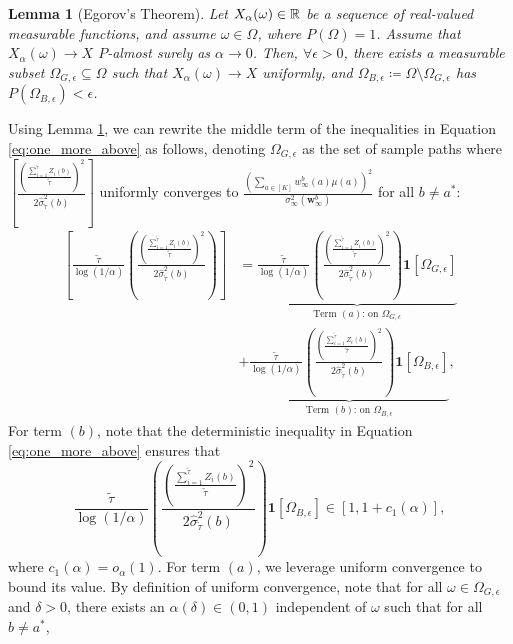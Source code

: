 \documentclass{article}
\newtheorem{lemma}{Lemma}
\begin{document}
\begin{appendices}
\begin{lemma}[Egorov's Theorem]\label{lem:egorov_thoerem}
    Let $X_\alpha(\omega) \in \mathbb{R}$ be a sequence of real-valued measurable functions, and assume $\omega \in \Omega$, where $P(\Omega)= 1$. Assume that $X_\alpha(\omega) \rightarrow X$ $P$-almost surely as $\alpha \rightarrow 0$. Then, $\forall \epsilon > 0$, there exists a measurable subset $\Omega_{G,\epsilon} \subseteq \Omega$ such that $X_{\alpha}(\omega) \rightarrow X$ uniformly, and $\Omega_{B,\epsilon} \coloneq \Omega \setminus \Omega_{G, \epsilon}$ has $P(\Omega_{B, \epsilon}) < \epsilon$. 
\end{lemma}

Using Lemma \ref{lem:egorov_thoerem}, we can rewrite the middle term of the inequalities in Equation \eqref{eq:one_more_above} as follows, denoting $\Omega_{G, \epsilon}$ as the set of sample paths where $\left[\frac{\left(\frac{\sum_{i=1}^{\tilde\tau}{Z}_i(b)}{\tilde\tau}\right)^2}{2 \hat\sigma_{\tilde\tau}^2(b)}\right]$ uniformly converges to $\frac{(\sum_{a \in [K]}w_\infty^b(a) \mu(a))^2}{\sigma_\infty^2(\bm{w}_\infty^b)}$ for all $b \neq a^*$:
\begin{align}
    \left[\frac{\tilde\tau}{\log(1/\alpha)}\left(\frac{\left(\frac{\sum_{i=1}^{\tilde\tau}{Z}_i(b)}{\tilde\tau}\right)^2}{2 \hat\sigma_{\tilde\tau}^2(b)}\right) \right] &= \underbrace{ 
    \frac{\tilde\tau}{\log(1/\alpha)}\left(\frac{\left(\frac{\sum_{i=1}^{\tilde\tau}{Z}_i(b)}{\tilde\tau}\right)^2}{2 \hat\sigma_{\tilde\tau}^2(b)}\right) \mathbf{1}\left[ \Omega_{G, \epsilon} \right]}_{\text{Term $(a)$: on }\Omega_{G, \epsilon}}\label{l:term_1}\\
    &+ \underbrace{\frac{\tilde\tau}{\log(1/\alpha)}\left(\frac{\left(\frac{\sum_{i=1}^{\tilde\tau}{Z}_i(b)}{\tilde\tau}\right)^2}{2 \hat\sigma_{\tilde\tau}^2(b)}\right)\mathbf{1}[\Omega_{B, \epsilon}] }_{\text{Term $(b)$: on }\Omega_{B , \epsilon}}, \label{l:term_2}
\end{align}
For term $(b)$, note that the deterministic inequality in Equation \eqref{eq:one_more_above} ensures that 
\begin{equation}
    \frac{\tilde\tau}{\log(1/\alpha)}\left(\frac{\left(\frac{\sum_{i=1}^{\tilde\tau}{Z}_i(b)}{\tilde\tau}\right)^2}{2 \hat\sigma_{\tilde\tau}^2(b)}\right)\mathbf{1}[\Omega_{B, \epsilon}] \in [1, 1+c_1(\alpha)],
\end{equation}
where $c_1(\alpha) = o_\alpha(1)$. For term $(a)$, we leverage uniform convergence to bound its value. By definition of uniform convergence, note that for all $\omega \in \Omega_{G, \epsilon}$ and $\delta > 0$, there exists an $\alpha(\delta) \in (0,1)$ independent of $\omega$ such that for all $b \neq a^*$, 

\end{appendices}
\end{document}
